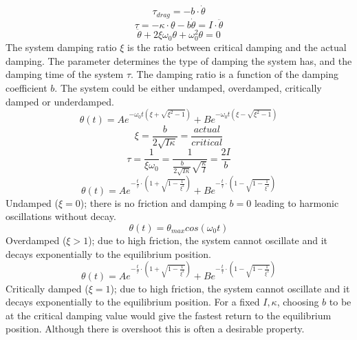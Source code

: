 \documentclass[\main/master.tex]{subfiles}
\begin{document}
\begin{equation}
\tau_{drag} = -b\cdot\dot{\theta}   \label{eqn:friction_torque}
\end{equation} 
\begin{equation}
\tau = -\kappa\cdot\theta - b\dot{\theta}  = I\cdot\ddot{\theta}   \label{eqn:damped_motion_equation}
\end{equation} 
\begin{equation}
\ddot{\theta} + 2\xi\omega_0\dot{\theta} + \omega_0^2\theta = 0   \label{eqn:damped_motion_equation}
\end{equation}
\noindent
The system damping ratio $\xi$ is the ratio between critical damping and the actual damping. The parameter determines the type of damping the system has, and the damping time of the system $\tau$. The damping ratio is a function of the damping coefficient $b$. The system could be either undamped, overdamped, critically damped or underdamped.
\begin{equation}
\theta(t) = Ae^{-\omega_0 t(\xi+\sqrt{\xi^2-1})} + Be^{-\omega_0 t(\xi-\sqrt{\xi^2-1})}    \label{eqn:damped_motion_equation}
\end{equation} 
\begin{equation}
\xi = \frac{b}{2\sqrt{I\kappa}} = \frac{actual}{critical}  \label{eqn:damped_motion_equation}
\end{equation}
\begin{equation}
\tau = \frac{1}{\xi\omega_0} = \frac{1}{\frac{b}{2\sqrt{I\kappa}}\sqrt{\frac{\kappa}{I}} }= \frac{2I}{b}  \label{eqn:damping_time}
\end{equation}
\begin{equation}
\theta(t) = Ae^{-\frac{t}{\tau}\cdot(1+\sqrt{1-\frac{1}{\xi^2}})} + Be^{-\frac{t}{\tau}\cdot(1-\sqrt{1-\frac{1}{\xi^2}})}    \label{eqn:damped_motion_equation}
\end{equation}
Undamped ($\xi = 0$); there is no friction and damping $b = 0$ leading to harmonic oscillations without decay.
\begin{equation}
\theta(t) = \theta_{max}cos(\omega_0 t )    \label{eqn:undamped_motion_equation}
\end{equation}
Overdamped ($\xi > 1$); due to high friction, the system cannot oscillate and it decays exponentially to the equilibrium position.
\begin{equation}
\theta(t) = Ae^{-\frac{t}{\tau}\cdot(1+\sqrt{1-\frac{1}{\xi^2}})} + Be^{-\frac{t}{\tau}\cdot(1-\sqrt{1-\frac{1}{\xi^2}})}    \label{eqn:overdamped_motion_equation}
\end{equation}
Critically damped ($\xi = 1$); due to high friction, the system cannot oscillate and it decays exponentially to the equilibrium position. For a fixed $I, \kappa$, choosing $b$ to be at the critical damping value would give the fastest return to the equilibrium position. Although there is overshoot this is often a desirable property.
\end{document}
